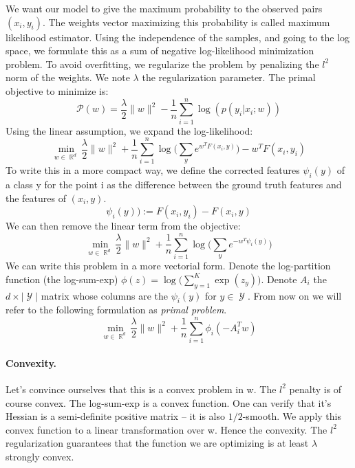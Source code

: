 \documentclass{article}
\DeclareMathOperator{\R}{\mathbb{R}}
\DeclareMathOperator{\1}{\mathbb{1}}
\DeclareMathOperator{\Y}{\mathcal{Y}}
\begin{document}
We want our model to give the maximum probability to the observed pairs $(x_i, y_i)$.
The weights vector maximizing this probability is called maximum likelihood estimator.
Using the independence of the samples, and going to the log space, we formulate this as a sum of negative log-likelihood minimization problem.
To avoid overfitting, we regularize the problem by penalizing the $l^2$ norm of the weights.
We note $\lambda$ the regularization parameter. The primal objective to minimize is:
\begin{equation*}
\mathscr P(w) = \frac{\lambda}{2}\|w\|^2 - \frac{1}{n}   \sum_{i=1}^{n} \log(p(y_i|x_i; w))	
\end{equation*}
Using the linear assumption, we expand the log-likelihood:
\begin{equation*}
	\min_{w\in\R^d} \frac{\lambda}{2}\|w\|^2 + \frac{1}{n}   \sum_{i=1}^{n}  \log \big (\sum_y e^{w^TF(x_i, y)} \big ) - w^TF(x_i, y_i)	
\end{equation*}
To write this in a more compact way, we define the corrected features $\psi_i(y)$ of a class y for the point i as the difference between the ground truth features and the features of $(x_i, y)$.
\begin{equation*}
	\psi_i(y)) := F(x_i, y_i) - F(x_i, y)
\end{equation*}
We can then remove the linear term from the objective:
\begin{equation*}
	\min_{w\in\R^d} \frac{\lambda}{2}\|w\|^2 + \frac{1}{n}   \sum_{i=1}^{n}  \log \big (\sum_y e^{- w^T\psi_i(y)} \big )
\end{equation*}
We can write this problem in a more vectorial form.
Denote the log-partition function (the log-sum-exp) $\phi(z) = \log \big(\sum_{y=1}^K \exp(z_y)\big)$. 
Denote $A_i$ the $d \times |\Y|$ matrix whose columns are the $\psi_i(y)$ for $y \in \Y$.
From now on we will refer to the following formulation as \textit{primal problem}.
\begin{equation}
	\label{primal}
	\min_{w\in\R^d}  \frac{\lambda}{2}\|w\|^2 + \frac{1}{n}   \sum_{i=1}^{n} \phi_i(-A_i^Tw)
\end{equation} 

\paragraph{Convexity.}
Let's convince ourselves that this is a convex problem in w.
The $l^2$ penalty is of course convex.
The log-sum-exp is a convex function.
One can verify that it's Hessian is a semi-definite positive matrix -- it is also $1/2$-smooth.
We apply this convex function to a linear transformation over w.
Hence the convexity.
The $l^2$ regularization guarantees that the function we are optimizing is at least $\lambda$ strongly convex. 
\end{document}
